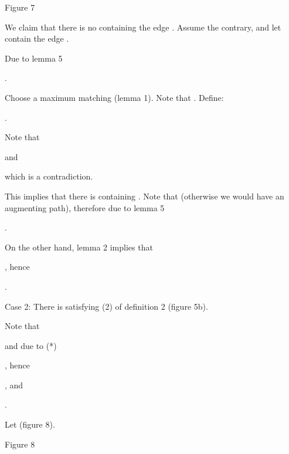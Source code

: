 \documentclass{article}
\begin{document}
\begin{center}

Figure 7\bigskip
\end{center}

We claim that there is no   containing the
edge . Assume the contrary, and let  contain the edge .

Due to lemma 5

\begin{center}
.
\end{center}

Choose a maximum matching   (lemma 1).
Note that . Define:

\begin{center}
.
\end{center}

Note that

\begin{center}
 and


\end{center}

which is a contradiction.

This implies that there is  
containing . Note that  (otherwise we would have an
augmenting path), therefore due to lemma 5

\begin{center}
.
\end{center}

On the other hand, lemma 2 implies that

\begin{center}
, hence

.
\end{center}

Case 2: There is  satisfying (2) of
definition 2 (figure 5b).

Note that

\begin{center}
 and due to (*)

 , hence

, and

.
\end{center}

Let  (figure 8).

\begin{center}

Figure 8\bigskip
\end{center}
\end{document}

